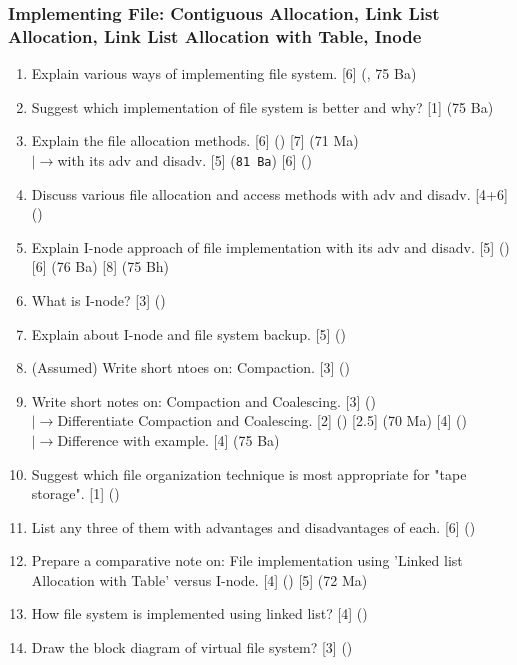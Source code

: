 \documentclass[12pt]{article}
\newcommand{\lb}{\\$\left|\rightarrow\right.$}
\begin{document}
		\subsubsection{Implementing File: Contiguous Allocation, Link List Allocation, Link List Allocation with Table, Inode}
			\begin{enumerate}
				\item Explain various ways of implementing file system. \hfill [6] (, 75 Ba)

				\item Suggest which implementation of file system is better and why? \hfill [1] (75 Ba)

				\item Explain the file allocation methods. \hfill [6] () [7] (71 Ma)
				\lb with its adv and disadv. \hfill [5] (\texttt{81 Ba}) [6] ()

				\item Discuss various file allocation and access methods with adv and disadv. \hfill [4+6] ()

				\item Explain I-node approach of file implementation with its adv and disadv. \hfill [5] () [6] (76 Ba) [8] (75 Bh)

				\item What is I-node? \hfill [3] ()

				\item Explain about I-node and file system backup. \hfill [5] ()

				\item (Assumed) Write short ntoes on: Compaction. \hfill [3] ()
				
				\item Write short notes on: Compaction and Coalescing. \hfill [3] ()
				\lb Differentiate Compaction and Coalescing. \hfill [2] () [2.5] (70 Ma) [4] ()
				\lb Difference with example. \hfill [4] (75 Ba)

				\item Suggest which file organization technique is most appropriate for "tape storage". \hfill [1] ()

				\item List any three of them with advantages and disadvantages of each. \hfill [6] ()

				\item Prepare a comparative note on: File implementation using 'Linked list Allocation with Table' versus I-node. \hfill [4] () [5] (72 Ma)

				\item How file system is implemented using linked list? \hfill [4] ()

				\item Draw the block diagram of virtual file system? \hfill [3] ()
			\end{enumerate}
\end{document}
